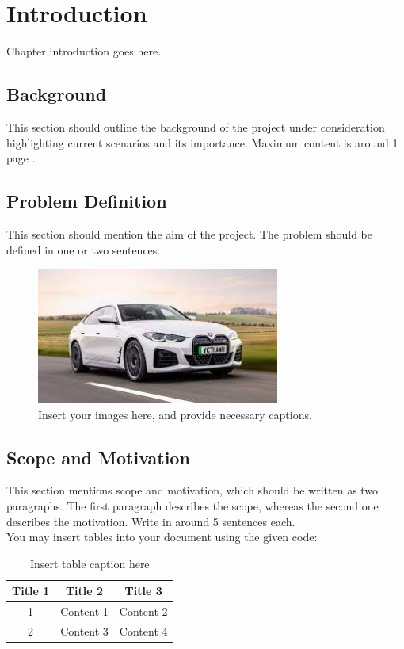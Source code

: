 \chapter{Introduction}
	
Chapter introduction goes here.
	\section{Background}
	
	This section should outline the background of the project under consideration highlighting current scenarios and its importance. Maximum content is around 1 page \cite{garg2019securing}.
	
	
	\section{Problem Definition}
	
	This section should mention the aim of the project. The problem should be defined in one or two sentences.
	

\begin{figure}[htbp]
		\centering
		\includegraphics[width=8.0cm]{Figures/car.jpeg}
		\caption{Insert your images here, and provide necessary captions.}
	\end{figure}
	
	
	\section{Scope and Motivation}
	
	This section mentions scope and motivation, which should be written as two paragraphs. The
	first paragraph describes the scope, whereas the second one describes the motivation. Write
	in around 5 sentences each. \\
	
	You may insert tables into your document using the given code:
	

	\begin{table}[!h]
		\begin{center}
		\caption{Insert table caption here}
			\begin{tabular}{|c|c|c|}
				\hline
				\textbf{Title 1} & \textbf{Title 2} & \textbf{Title 3} \\
				\hline
				1 & Content 1 & Content 2 \\
				\cline{1-2}
				2 & Content 3 & Content 4\\
				\hline
			\end{tabular}
		\end{center}
	\end{table}


